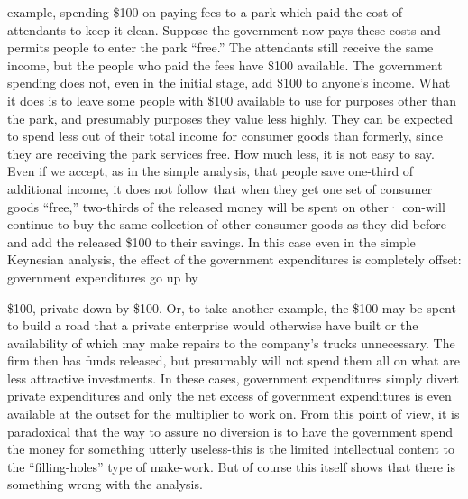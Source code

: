 \documentclass[11pt,openany]{book}
\begin{document}
example, spending \$100 on paying fees to a park which paid the cost of attendants to keep it clean. Suppose the government now pays these costs and permits people to enter the park ``free.'' The attendants still receive the same income, but the people who paid the fees have \$100 available. The government spending does not, even in the initial stage, add \$100 to anyone's income. What it does is to leave some people with \$100 available to use for purposes other than the park, and presumably purposes they value less highly. They can be expected to spend less out of their total income for consumer goods than formerly, since they are receiving the park services free. How much less, it is not easy to say. Even if we accept, as in the simple analysis, that people save one-third of additional income, it does not follow that when they get one set of consumer goods ``free,'' two-thirds of the released money will be spent on other· con-will continue to buy the same collection of other consumer goods as they did before and add the released \$100 to their savings. In this case even in the simple Keynesian analysis, the effect of the government expenditures is completely offset: government expenditures go up by

\$100, private down by \$100. Or, to take another example, the \$100 may be spent to build a road that a private enterprise would otherwise have built or the availability of which may make repairs to the company's trucks unnecessary. The firm then has funds released, but presumably will not spend them all on what are less attractive investments. In these cases, government expenditures simply divert private expenditures and only the net excess of government expenditures is even available at the outset for the multiplier to work on. From this point of view, it is paradoxical that the way to assure no diversion is to have the government spend the money for something utterly useless-this is the limited intellectual content to the ``filling-holes'' type of make-work. But of course this itself shows that there is something wrong with the analysis.
\end{document}
